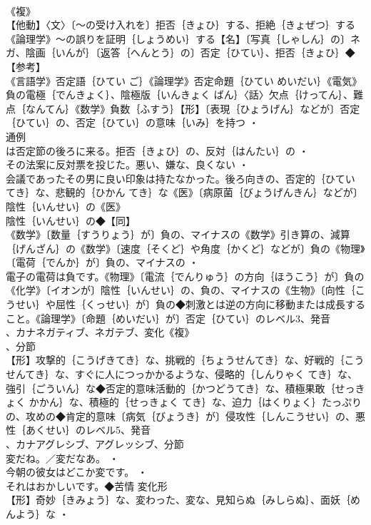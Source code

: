 \documentclass[8pt]{extreport}
\begin{document}
\begin{CJK}{UTF8}{min}
\\	《複》
\\	【他動】〈文〉〔～の受け入れを〕拒否｛きょひ｝する、拒絶｛きょぜつ｝する《論理学》～の誤りを証明｛しょうめい｝する【名】〔写真｛しゃしん｝の〕ネガ、陰画｛いんが｝〔返答｛へんとう｝の〕否定｛ひてい｝、拒否｛きょひ｝◆【参考】
\\	《言語学》否定語｛ひてい ご｝《論理学》否定命題｛ひてい めいだい｝《電気》負の電極｛でんきょく｝、陰極版｛いんきょく ばん｝〈話〉欠点｛けってん｝、難点｛なんてん｝《数学》負数｛ふすう｝【形】〔表現｛ひょうげん｝などが〕否定｛ひてい｝の、否定｛ひてい｝の意味｛いみ｝を持つ ・
\\	通例
\\	は否定節の後ろに来る。拒否｛きょひ｝の、反対｛はんたい｝の ・
\\	その法案に反対票を投じた。悪い、嫌な、良くない ・
\\	会議であったその男に良い印象は持たなかった。後ろ向きの、否定的｛ひてい てき｝な、悲観的｛ひかん てき｝な《医》〔病原菌｛びょうげんきん｝などが〕陰性｛いんせい｝の《医》
\\	陰性｛いんせい｝の◆【同】
\\	《数学》〔数量｛すうりょう｝が〕負の、マイナスの《数学》引き算の、減算｛げんざん｝の《数学》〔速度｛そくど｝や角度｛かくど｝などが〕負の《物理》〔電荷｛でんか｝が〕負の、マイナスの ・
\\	電子の電荷は負です。《物理》〔電流｛でんりゅう｝の方向｛ほうこう｝が〕負の《化学》〔イオンが〕陰性｛いんせい｝の、負の、マイナスの《生物》〔向性｛こうせい｝や屈性｛くっせい｝が〕負の◆刺激とは逆の方向に移動または成長すること。《論理学》〔命題｛めいだい｝が〕否定｛ひてい｝のレベル3、発音
\\	、カナネガティブ、ネガテブ、変化《複》
\\	、分節
\\	【形】攻撃的｛こうげきてき｝な、挑戦的｛ちょうせんてき｝な、好戦的｛こうせんてき｝な、すぐに人につっかかるような、侵略的｛しんりゃく てき｝な、強引｛ごういん｝な◆否定的意味活動的｛かつどうてき｝な、積極果敢｛せっきょく かかん｝な、積極的｛せっきょく てき｝な、迫力｛はくりょく｝たっぷりの、攻めの◆肯定的意味〔病気｛びょうき｝が〕侵攻性｛しんこうせい｝の、悪性｛あくせい｝のレベル5、発音
\\	、カナアグレシブ、アグレッシブ、分節
\\	変だね。／変だなあ。 ・
\\	今朝の彼女はどこか変です。 ・
\\	それはおかしいです。◆苦情	変化形 
\\	【形】奇妙｛きみょう｝な、変わった、変な、見知らぬ｛みしらぬ｝、面妖｛めんよう｝な ・

\end{CJK}
\end{document}
